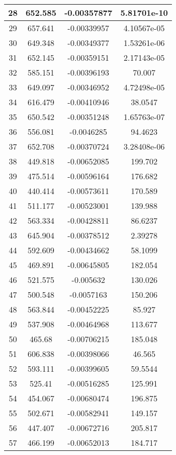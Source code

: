 \begin{table}[h]
{\begin{tabular}{|c|c|c|c|}
28	&	652.585	&	-0.00357877	&	5.81701e-10	\\	\hline
29	&	657.641	&	-0.00339957	&	4.10567e-05	\\	\hline
30	&	649.348	&	-0.00349377	&	1.53261e-06	\\	\hline
31	&	652.145	&	-0.00359151	&	2.17143e-05	\\	\hline
32	&	585.151	&	-0.00396193	&	70.007	\\	\hline
33	&	649.097	&	-0.00346952	&	4.72498e-05	\\	\hline
34	&	616.479	&	-0.00410946	&	38.0547	\\	\hline
35	&	650.542	&	-0.00351248	&	1.65763e-07	\\	\hline
36	&	556.081	&	-0.0046285	&	94.4623	\\	\hline
37	&	652.708	&	-0.00370724	&	3.28408e-06	\\	\hline
38	&	449.818	&	-0.00652085	&	199.702	\\	\hline
39	&	475.514	&	-0.00596164	&	176.682	\\	\hline
40	&	440.414	&	-0.00573611	&	170.589	\\	\hline
41	&	511.177	&	-0.00523001	&	139.988	\\	\hline
42	&	563.334	&	-0.00428811	&	86.6237	\\	\hline
43	&	645.904	&	-0.00378512	&	2.39278	\\	\hline
44	&	592.609	&	-0.00434662	&	58.1099	\\	\hline
45	&	469.891	&	-0.00645805	&	182.054	\\	\hline
46	&	521.575	&	-0.005632	&	130.026	\\	\hline
47	&	500.548	&	-0.0057163	&	150.206	\\	\hline
48	&	563.844	&	-0.00452225	&	85.927	\\	\hline
49	&	537.908	&	-0.00464968	&	113.677	\\	\hline
50	&	465.68	&	-0.00706215	&	185.048	\\	\hline
51	&	606.838	&	-0.00398066	&	46.565	\\	\hline
52	&	593.111	&	-0.00399605	&	59.5544	\\	\hline
53	&	525.41	&	-0.00516285	&	125.991	\\	\hline
54	&	454.067	&	-0.00680474	&	196.875	\\	\hline
55	&	502.671	&	-0.00582941	&	149.157	\\	\hline
56	&	447.407	&	-0.00672716	&	205.817	\\	\hline
57	&	466.199	&	-0.00652013	&	184.717	\\	\hline

\end{tabular}}
\end{table}

